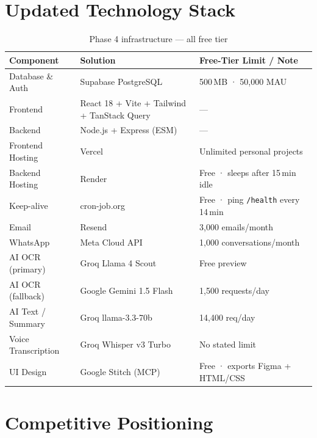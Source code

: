 \documentclass[11pt,a4paper]{article}
\begin{document}
\section{Updated Technology Stack}

\begin{table}[h]
\centering
\renewcommand{\arraystretch}{1.4}
\begin{tabularx}{\linewidth}{p{3.2cm} p{4.8cm} X}
\toprule
\textbf{Component} & \textbf{Solution} & \textbf{Free-Tier Limit / Note} \\
\midrule
Database \& Auth     & Supabase PostgreSQL       & 500\,MB · 50,000 MAU \\
Frontend             & React 18 + Vite + Tailwind + TanStack Query & — \\
Backend              & Node.js + Express (ESM)   & — \\
Frontend Hosting     & Vercel                    & Unlimited personal projects \\
Backend Hosting      & Render                    & Free · sleeps after 15\,min idle \\
Keep-alive           & cron-job.org              & Free · ping \texttt{/health} every 14\,min \\
Email                & Resend                    & 3,000 emails/month \\
WhatsApp             & Meta Cloud API            & 1,000 conversations/month \\
AI OCR (primary)     & Groq Llama 4 Scout        & Free preview \\
AI OCR (fallback)    & Google Gemini 1.5 Flash   & 1,500 requests/day \\
AI Text / Summary    & Groq llama-3.3-70b        & 14,400 req/day \\
Voice Transcription  & Groq Whisper v3 Turbo     & No stated limit \\
UI Design            & Google Stitch (MCP)       & Free · exports Figma + HTML/CSS \\
\bottomrule
\end{tabularx}
\caption{Phase 4 infrastructure — all free tier}
\end{table}

\section{Competitive Positioning}
\end{document}
